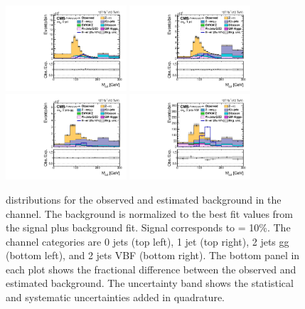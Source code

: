 \begin{figure}[htbp!]
  \centering
  \includegraphics[width=0.4\textwidth]{plots/chapter9/CB/emu/0jet.pdf}
  \includegraphics[width=0.4\textwidth]{plots/chapter9/CB/emu/1jet.pdf} \\
  \includegraphics[width=0.4\textwidth]{plots/chapter9/CB/emu/2jet_gg.pdf}
  \includegraphics[width=0.4\textwidth]{plots/chapter9/CB/emu/2jet_vbf.pdf} \\
  \caption{\mcol distributions for the observed and estimated background in the \emu channel. The background is normalized to the best fit values from the signal plus background fit. Signal corresponds to \BHet = 10\%. The \emu channel categories are 0 jets (top left), 1 jet (top right), 2 jets gg (bottom left), and 2 jets VBF (bottom right). The bottom panel in each plot shows the fractional difference between the observed and estimated background. The uncertainty band shows the statistical and systematic uncertainties added in quadrature.}
  \label{fig:mcol_emu}
\end{figure}

